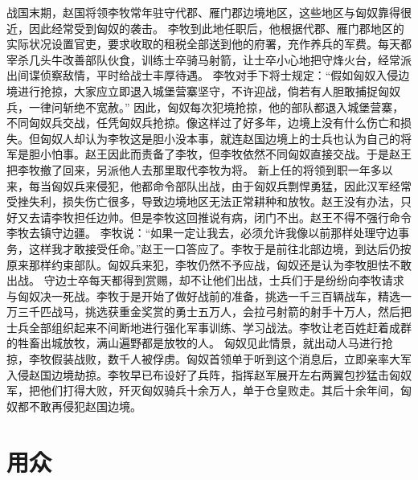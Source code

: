\documentclass[a4paper,12pt,UTF8,twoside]{ctexbook}
\begin{document}
战国末期，赵国将领李牧常年驻守代郡、雁门郡边境地区，这些地区与匈奴靠得很近，因此经常受到匈奴的袭击。
李牧到此地任职后，他根据代郡、雁门郡地区的实际状况设置官吏，要求收取的租税全部送到他的府署，充作养兵的军费。每天都宰杀几头牛改善部队伙食，训练士卒骑马射箭，让士卒小心地把守烽火台，经常派出间谍侦察敌情，平时给战士丰厚待遇。
李牧对手下将士规定：“假如匈奴入侵边境进行抢掠，大家应立即退入城堡营寨坚守，不许迎战，倘若有人胆敢捕捉匈奴兵，一律问斩绝不宽赦。”
因此，匈奴每次犯境抢掠，他的部队都退入城堡营寨，不同匈奴兵交战，任凭匈奴兵抢掠。像这样过了好多年，边境上没有什么伤亡和损失。但匈奴人却认为李牧这是胆小没本事，就连赵国边境上的士兵也认为自己的将军是胆小怕事。赵王因此而责备了李牧，但李牧依然不同匈奴直接交战。于是赵王把李牧撤了回来，另派他人去那里取代李牧为将。
新上任的将领到职一年多以来，每当匈奴兵来侵犯，他都命令部队出战，由于匈奴兵剽悍勇猛，因此汉军经常受挫失利，损失伤亡很多，导致边境地区无法正常耕种和放牧。赵王没有办法，只好又去请李牧担任边帅。但是李牧这回推说有病，闭门不出。赵王不得不强行命令李牧去镇守边疆。
李牧说：“如果一定让我去，必须允许我像以前那样处理守边事务，这样我才敢接受任命。”赵王一口答应了。李牧于是前往北部边境，到达后仍按原来那样约束部队。匈奴兵来犯，李牧仍然不予应战，匈奴还是认为李牧胆怯不敢出战。
守边士卒每天都得到赏赐，却不让他们出战，士兵们于是纷纷向李牧请求与匈奴决一死战。李牧于是开始了做好战前的准备，挑选一千三百辆战车，精选一万三千匹战马，挑选获重金奖赏的勇士五万人，会拉弓射箭的射手十万人，然后把士兵全部组织起来不间断地进行强化军事训练、学习战法。李牧让老百姓赶着成群的牲畜出城放牧，满山遍野都是放牧的人。
匈奴见此情景，就出动人马进行抢掠，李牧假装战败，数千人被俘虏。匈奴首领单于听到这个消息后，立即亲率大军入侵赵国边境劫掠。李牧早已布设好了兵阵，指挥赵军展开左右两翼包抄猛击匈奴军，把他们打得大败，歼灭匈奴骑兵十余万人，单于仓皇败走。其后十余年间，匈奴都不敢再侵犯赵国边境。


\chapter{用众}
\end{document}
